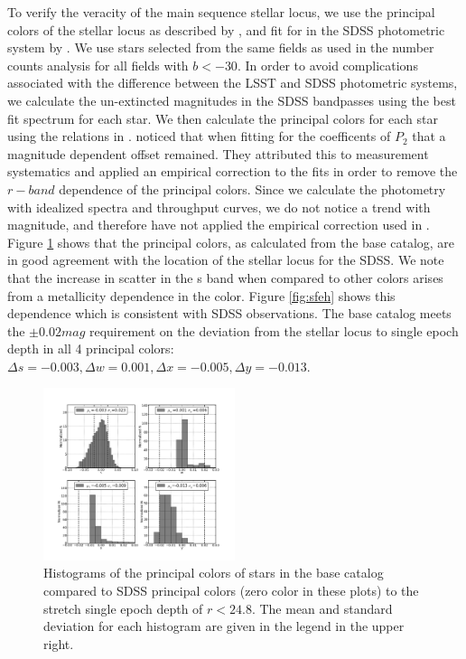 \documentclass[11pt]{article}
\begin{document}
To verify the veracity of the main sequence stellar locus, we use the
principal colors of the stellar locus as described by \citet{helmi02},
and fit for in the SDSS photometric system by \citet{ivezic04}.  We
use stars selected from the same fields as used in the number counts
analysis for all fields with $b<-30$.  In order to avoid complications
associated with the difference between the LSST and SDSS photometric
systems, we calculate the un-extincted magnitudes in the SDSS
bandpasses using the best fit spectrum for each star.  We then
calculate the principal colors for each star using the relations in
\citet{ivezic04}.  \citet{ivezic04} noticed that when fitting for the
coefficents of $P_{2}$ that a magnitude dependent offset remained.
They attributed this to measurement systematics and applied an
empirical correction to the fits in order to remove the $r-band$
dependence of the principal colors.  Since we calculate the photometry
with idealized spectra and throughput curves, we do not notice a trend
with magnitude, and therefore have not applied the empirical
correction used in \citet{ivezic04}.  Figure
\ref{fig:principalcolorshist} shows that the principal colors, as
calculated from the base catalog, are in good agreement with the
location of the stellar locus for the SDSS.  We note that the increase
in scatter in the s band when compared to other colors arises from a
metallicity dependence in the color.  Figure \ref{fig:sfeh} shows this
dependence which is consistent with SDSS observations. The base
catalog meets the $\pm0.02mag$ requirement on the deviation from the
stellar locus to single epoch depth in all 4 principal colors:
${\Delta}s=-0.003, {\Delta}w=0.001, {\Delta}x=-0.005,
{\Delta}y=-0.013$.

\begin{figure}[h]
\centering
\includegraphics[width=0.5\textwidth]{validation_figures/principal_colors_hist.png}
\caption{Histograms of the principal colors of stars in the base
  catalog compared to SDSS principal colors (zero color in these
  plots) to the stretch single epoch depth of $r < 24.8$. The mean and
  standard deviation for each histogram are given in the legend in the
  upper right.\label{fig:principalcolorshist}}
\end{figure}
\end{document}
